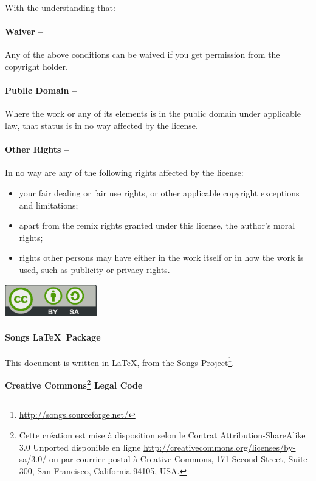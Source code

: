 {\begin{lblock}{With the understanding that:}
    \hspace{0.4cm}
    \parbox{15cm}{
      \paragraph{Waiver --}
      Any of the above conditions can be waived if you get permission
      from the copyright holder.

      \paragraph{Public Domain --}
      Where the work or any of its elements is in the public domain
      under applicable law, that status is in no way affected by the
      license.

      \paragraph{Other Rights --}
      In no way are any of the following rights affected by the license:
      \begin{itemize}
      \item your fair dealing or fair use rights, or other applicable
        copyright exceptions and limitations;
      \item apart from the remix rights granted under this license,
        the author's moral rights;
      \item rights other persons may have either in the work itself
        or in how the work is used, such as publicity or privacy rights.
      \end{itemize}
    }

    \begin{center}
      \includegraphics[width=4cm]{img/license}
    \end{center}

  \end{lblock}
  \paragraph{Songs \LaTeX~Package}
  This document is written in \LaTeX, from the Songs
  Project\footnote{\url{http://songs.sourceforge.net/}}.
}{
  \begin{center}
    \textbf{\LARGE{Creative Commons\footnote{ Cette création est mise à
          disposition selon le Contrat Attribution-ShareAlike 3.0
          Unported disponible en ligne
          \url{http://creativecommons.org/licenses/by-sa/3.0/} ou par
          courrier postal à Creative Commons, 171 Second Street, Suite
          300, San Francisco, California 94105, USA.} Legal Code} }
  \end{center}
  \vspace{1cm}

}
